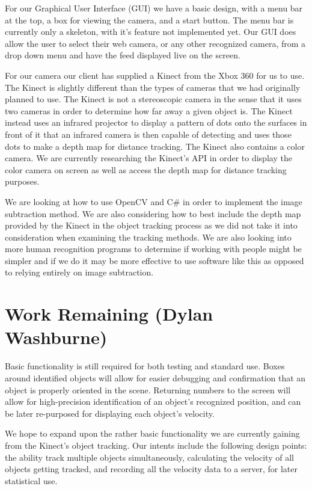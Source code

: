 \documentclass[onecolumn, draftclsnofoot,10pt, compsoc]{IEEEtran}
\begin{document}
For our Graphical User Interface (GUI) we have a basic design, with a menu bar at the top, a box for viewing the camera, and a start button. The menu bar is currently only a skeleton, with it's feature not implemented yet. 
Our GUI does allow the user to select their web camera, or any other recognized camera, from a drop down menu and have the feed displayed live on the screen.

For our camera our client has supplied a Kinect from the Xbox 360 for us to use. 
The Kinect is slightly different than the types of cameras that we had originally planned to use.
The Kinect is not a stereoscopic camera in the sense that it uses two cameras in order to determine how far away a given object is. 
The Kinect instead uses an infrared projector to display a pattern of dots onto the surfaces in front of it that an infrared camera is then capable of detecting and uses those dots to make a depth map for distance tracking.
The Kinect also contains a color camera. 
We are currently researching the Kinect's API in order to display the color camera on screen as well as access the depth map for distance tracking purposes.

We are looking at how to use OpenCV and C\# in order to implement the image subtraction method.
We are also considering how to best include the depth map provided by the Kinect in the object tracking process as we did not take it into consideration when examining the tracking methods. 
We are also looking into more human recognition programs to determine if working with people might be simpler and if we do it may be more effective to use software like this as opposed to relying entirely on image subtraction.

\section{Work Remaining (Dylan Washburne)}
Basic functionality is still required for both testing and standard use.  Boxes around identified objects will allow for easier debugging and confirmation that an object is properly oriented in the scene.  Returning numbers to the screen will allow for high-precision identification of an object's recognized position, and can be later re-purposed for displaying each object's velocity.

We hope to expand upon the rather basic functionality we are currently gaining from the Kinect's object tracking.  
Our intents include the following design points: the ability track multiple objects simultaneously, calculating the velocity of all objects getting tracked, and recording all the velocity data to a server, for later statistical use.
\end{document}
